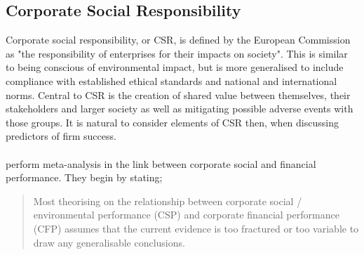 \subsection{Corporate Social Responsibility}
{Corporate social responsibility, or CSR, is defined by the European Commission as "the responsibility of enterprises for their impacts on society". This is similar to being conscious of environmental impact, but is more generalised to include compliance with established ethical standards and national and international norms. Central to CSR is the creation of shared value between themselves, their stakeholders and larger society as well as mitigating possible adverse events with those groups. It is natural to consider elements of CSR then, when discussing predictors of firm success. \\\\
\cite{orlitzky2003corporate} perform meta-analysis in the link between corporate social and financial performance. They begin by stating;
\begin{quote}
Most theorising on the relationship between corporate social / environmental performance (CSP) and corporate financial performance (CFP) assumes that the current evidence is too fractured or too variable to draw any generalisable conclusions.


\end{quote}}
